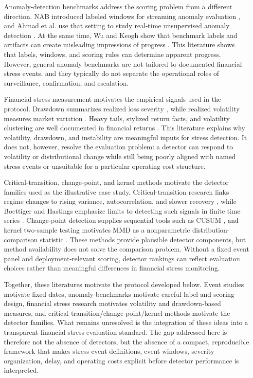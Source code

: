 \documentclass[pdflatex,sn-mathphys-num]{sn-jnl}
\begin{document}
Anomaly-detection benchmarks address the scoring problem from a different direction. NAB introduced labeled windows for streaming anomaly evaluation \cite{lavin2015}, and Ahmad et al. use that setting to study real-time unsupervised anomaly detection \cite{ahmad2017}. At the same time, Wu and Keogh show that benchmark labels and artifacts can create misleading impressions of progress \cite{wu2022}. This literature shows that labels, windows, and scoring rules can determine apparent progress. However, general anomaly benchmarks are not tailored to documented financial stress events, and they typically do not separate the operational roles of surveillance, confirmation, and escalation.

Financial stress measurement motivates the empirical signals used in the protocol. Drawdown summarizes realized loss severity \cite{magdon2004}, while realized volatility measures market variation \cite{andersen2003}. Heavy tails, stylized return facts, and volatility clustering are well documented in financial returns \cite{mandelbrot1963,cont2001,engle1982,bollerslev1986}. This literature explains why volatility, drawdown, and instability are meaningful inputs for stress detection. It does not, however, resolve the evaluation problem: a detector can respond to volatility or distributional change while still being poorly aligned with named stress events or unsuitable for a particular operating cost structure.

Critical-transition, change-point, and kernel methods motivate the detector families used as the illustrative case study. Critical-transition research links regime changes to rising variance, autocorrelation, and slower recovery \cite{scheffer2009,dakos2012}, while Boettiger and Hastings emphasize limits to detecting such signals in finite time series \cite{boettiger2012}. Change-point detection supplies sequential tools such as CUSUM \cite{page1954}, and kernel two-sample testing motivates MMD as a nonparametric distribution-comparison statistic \cite{gretton2012}. These methods provide plausible detector components, but method availability does not solve the comparison problem. Without a fixed event panel and deployment-relevant scoring, detector rankings can reflect evaluation choices rather than meaningful differences in financial stress monitoring.

Together, these literatures motivate the protocol developed below. Event studies motivate fixed dates, anomaly benchmarks motivate careful label and scoring design, financial stress research motivates volatility and drawdown-based measures, and critical-transition/change-point/kernel methods motivate the detector families. What remains unresolved is the integration of these ideas into a transparent financial-stress evaluation standard. The gap addressed here is therefore not the absence of detectors, but the absence of a compact, reproducible framework that makes stress-event definitions, event windows, severity organization, delay, and operating costs explicit before detector performance is interpreted.
\end{document}
